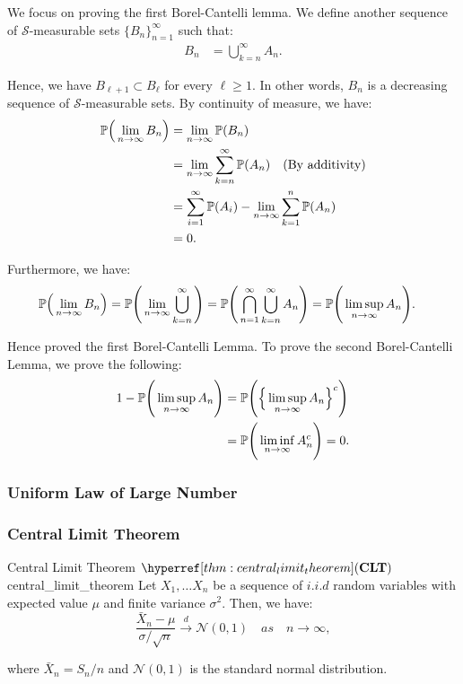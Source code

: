 \begin{proof*}
    We focus on proving the first Borel-Cantelli lemma. We define another sequence of $\mathcal{S}$-measurable sets $\{B_n\}_{n=1}^\infty$ such that:
    \begin{align*}
        B_n &= \bigcup_{k=n}^\infty A_n.
    \end{align*}

    \noindent Hence, we have $B_{\ell+1}\subset B_\ell$ for every $\ell\ge 1$. In other words, $B_n$ is a decreasing sequence of $\mathcal{S}$-measurable sets. By continuity of measure, we have:
    \begin{align*}
        \mathbb{P}\Big( \lim_{n\to\infty} B_n \Big) &= \lim_{n\to\infty} \mathbb{P}(B_n) \\
            &= \lim_{n\to\infty} \sum_{k=n}^\infty \mathbb{P}(A_n) \quad \text{(By additivity)} \\
            &= \sum_{i=1}^\infty\mathbb{P}(A_i) - \lim_{n\to\infty} \sum_{k=1}^n \mathbb{P}(A_n) \\
            &= 0.
    \end{align*}

    \noindent Furthermore, we have:
    \begin{align*}
        \mathbb{P}\Big( \lim_{n\to\infty} B_n \Big) &= \mathbb{P}\Bigg( \lim_{n\to\infty} \bigcup_{k=n}^\infty \Bigg) = \mathbb{P}\Bigg( \bigcap_{n=1}^\infty \bigcup_{k=n}^\infty A_n \Bigg) = \mathbb{P}\Bigg( \limsup_{n\to\infty} A_n \Bigg).
    \end{align*}

    \noindent Hence proved the first Borel-Cantelli Lemma. To prove the second Borel-Cantelli Lemma, we prove the following:
    \begin{align*}
        1 - \mathbb{P}\Bigg( \limsup_{n\to\infty} A_n \Bigg) &= \mathbb{P}\Bigg( \Big\{ \limsup_{n\to\infty} A_n \Big\}^c \Bigg) \\
        &= \mathbb{P}\Bigg( \liminf_{n\to\infty} A_n^c \Bigg) = 0.
    \end{align*}
\end{proof*}


\subsubsection{Uniform Law of Large Number}



\subsubsection{Central Limit Theorem}
\begin{theorem}{Central Limit Theorem $\CLT$}{central_limit_theorem}
    Let $X_1, \dots X_n$ be a sequence of $i.i.d$ random variables with expected value $\mu$ and finite variance $\sigma^2$. Then, we have:
    \begin{equation}
        \frac{\bar X_n - \mu}{\sigma/\sqrt{n}} \xrightarrow{d} \mathcal{N}(0, 1) \quad as \quad n \to \infty,
    \end{equation}

    \noindent where $\bar X_n = S_n/n$ and $\mathcal{N}(0,1)$ is the standard normal distribution.
\end{theorem}

